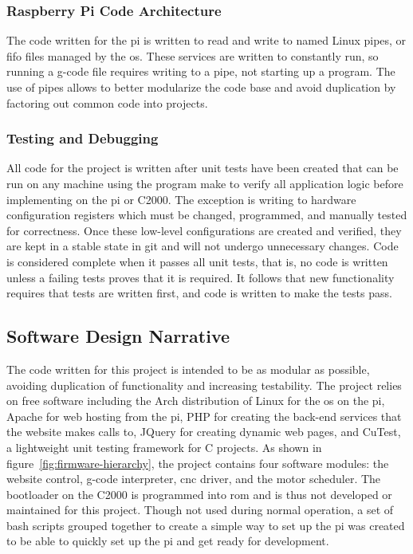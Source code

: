 \subsubsection{Raspberry Pi Code Architecture}
The code written for the \gls{pi} is written to read and write to named Linux pipes, or \gls{fifo} files managed by the \gls{os}.
These services are written to constantly run, so running a g-code file requires writing to a pipe, not starting up a program.
The use of pipes allows to better modularize the code base and avoid duplication by factoring out common code into projects.

\subsubsection{Testing and Debugging}
All code for the project is written after unit tests have been created that can be run on any machine using the program make to verify all application logic before implementing on the \gls{pi} or C2000.
The exception is writing to hardware configuration registers which must be changed, programmed, and manually tested for correctness.
Once these low-level configurations are created and verified, they are kept in a stable state in git and will not undergo unnecessary changes.
Code is considered complete when it passes all unit tests, that is, no code is written unless a failing tests proves that it is required.
It follows that new functionality requires that tests are written first, and code is written to make the tests pass.

\subsection{Software Design Narrative}
The code written for this project is intended to be as modular as possible, avoiding duplication of functionality and increasing testability.
The project relies on free software including the Arch distribution of Linux\cite{archlinux} for the \gls{os} on the \gls{pi}, Apache for web hosting from the \gls{pi}, PHP for creating the back-end services that the website makes calls to, JQuery for creating dynamic web pages, and CuTest, a lightweight unit testing framework for C projects.
As shown in figure~\ref{fig:firmware-hierarchy}, the project contains four software modules: the website control, g-code interpreter, \gls{cnc} driver, and the motor scheduler.
The bootloader on the C2000 is programmed into \gls{rom} and is thus not developed or maintained for this project.
Though not used during normal operation, a set of bash scripts grouped together to create a simple way to set up the \gls{pi} was created to be able to quickly set up the \gls{pi} and get ready for development.


